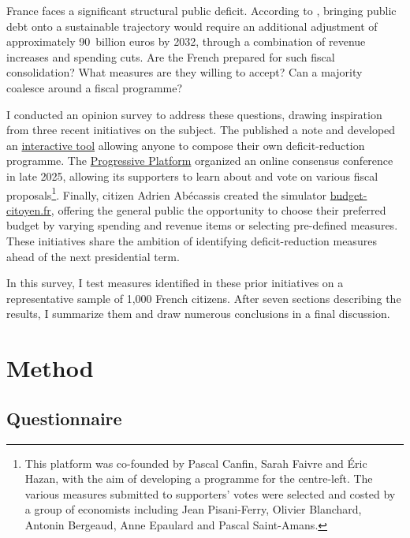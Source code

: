 \documentclass[12pt,english]{article}
\newcommand{\blue}[1]{\textcolor{blue!60!black}{#1}}
\begin{document}
France faces a significant structural public deficit. According to \citet{CAE2025}, \blue{bringing public debt onto a sustainable trajectory would require an additional adjustment of approximately 90~billion euros by 2032}, through a combination of revenue increases and spending cuts.
\blue{Are the French prepared for such fiscal consolidation? What measures are they willing to accept? Can a majority coalesce around a fiscal programme?}

I conducted an opinion survey to address these questions, drawing inspiration from three recent initiatives on the subject. The \cite{CAE2025} published a note and developed an \href{https://claude.ai/public/artifacts/74cd0701-a4f0-499e-a409-cae1da524ee4}{interactive tool} allowing anyone to compose their own deficit-reduction programme. The \href{https://laplateformeprogressiste.org/wp-content/uploads/2025/12/20251210_Resultats-par-mesure-1.pdf}{Progressive Platform} organized an online consensus conference in late 2025, allowing its supporters to learn about and vote on various fiscal proposals\footnote{This platform was co-founded by Pascal Canfin, Sarah Faivre and Éric Hazan, with the aim of developing a programme for the centre-left. The various measures submitted to supporters' votes were selected and costed by a group of economists including Jean Pisani-Ferry, Olivier Blanchard, Antonin Bergeaud, Anne Epaulard and Pascal Saint-Amans.}. Finally, citizen Adrien Abécassis created the simulator \href{https://budget-citoyen.fr}{budget-citoyen.fr}, offering the general public the opportunity to choose their preferred budget by varying spending and revenue items or selecting pre-defined measures. These initiatives share the ambition of identifying deficit-reduction measures ahead of the next presidential term.

In this survey, I test measures identified in these prior initiatives on a representative sample of 1,000 French citizens.
After seven sections describing the results, I summarize them and draw numerous conclusions in a final discussion.


\section{Method}
\label{sec:methode}

\subsection{Questionnaire}
\end{document}
